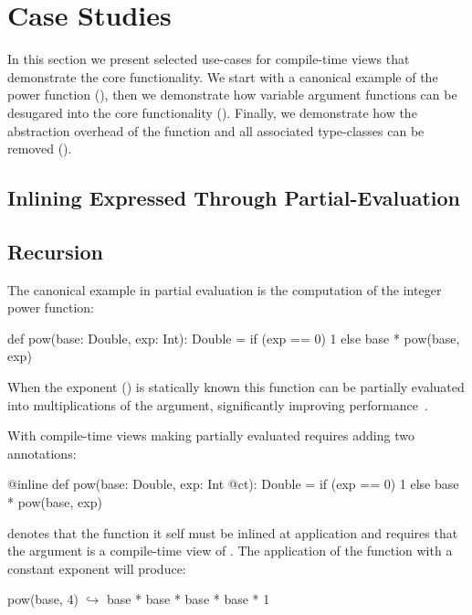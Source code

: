 \section{Case Studies}
\label{sct:case-studies}

In this section we present selected use-cases for compile-time views that demonstrate
 the core functionality. We start with a canonical example of the power function
 (), then we demonstrate how variable argument functions can be
 desugared into the core functionality (). Finally, we demonstrate how
 the abstraction overhead of the  function and all associated type-classes
 can be removed ().

\subsection{Inlining Expressed Through Partial-Evaluation}
\label{sct:inlining}

\subsection{Recursion}
\label{sct:recursion}

The canonical example in partial evaluation is the computation of the integer power
 function:
\begin{lstparagraph}
def pow(base: Double, exp: Int): Double =
  if (exp == 0) 1 else base * pow(base, exp)
\end{lstparagraph} When the exponent () is statically known this function can be partially
evaluated into  multiplications of the  argument, significantly
improving performance~\cite{}.


With compile-time views making partially evaluated requires adding two annotations:

\begin{lstparagraph}
@inline def pow(base: Double, exp: Int @ct): Double =
  if (exp == 0) 1 else base * pow(base, exp)
\end{lstparagraph}

 denotes that the  function it self must be inlined at application
 and  requires that the  argument is a compile-time view of .
 The application of the function  with a constant exponent will produce:

\begin{lstparagraph}
pow(base, 4)
  $\hookrightarrow$ base * base * base * base * 1
\end{lstparagraph}

